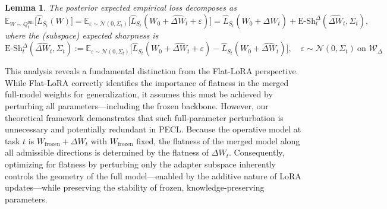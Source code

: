 \documentclass{article} %
\newtheorem{lemma}{Lemma}
\begin{document}
\begin{lemma}
\label{lemma: subspace-full}
    The posterior expected empirical loss decomposes as
\[
\mathbb{E}_{W\sim Q_t^{\mathrm{full}}}\big[\hat{L}_{S_t}(W)\big]
= \mathbb{E}_{\varepsilon\sim\mathcal N(0,\Sigma_t)}
    \big[\hat{L}_{S_t}(W_0+\hat{\Delta W}_t+\varepsilon)\big]
= \hat{L}_{S_t}(W_0+\hat{\Delta W}_t)
  + \mathrm{E\text{-}Sh}_t^{\Delta}(\hat{\Delta W}_t,\Sigma_t),
\]
where the (subspace) expected sharpness is
$$
\mathrm{E\text{-}Sh}_t^{\Delta}(\hat{\Delta W}_t,\Sigma_t)
:= \mathbb{E}_{\varepsilon\sim\mathcal N(0,\Sigma_t)}
   \big[\hat{L}_{S_t}(W_0+\hat{\Delta W}_t+\varepsilon)
       - \hat{L}_{S_t}(W_0+\hat{\Delta W}_t)\big],\quad
\varepsilon\sim\mathcal N(0,\Sigma_t)\ \text{on } \mathcal W_\Delta$$
\end{lemma}
 


This analysis reveals a fundamental distinction from the Flat-LoRA perspective\cite{li2025flatloralowrankadaptationflat}. 
While Flat-LoRA correctly identifies the importance of flatness in the merged full-model weights for generalization, it assumes this must be achieved by perturbing all parameters—including the frozen backbone.
However, our theoretical framework demonstrates that such full-parameter perturbation is unnecessary and potentially redundant in PECL. Because the operative model at task \(t\) is \(W_{\text{frozen}}+\Delta W_t\) with \(W_{\text{frozen}}\) fixed, the flatness of the merged model along all admissible directions is determined by the flatness of \(\Delta W_t\). Consequently, optimizing for flatness by perturbing only the adapter subspace inherently controls the geometry of the full model—enabled by the additive nature of LoRA updates—while preserving the stability of frozen, knowledge-preserving parameters.



\end{document}
